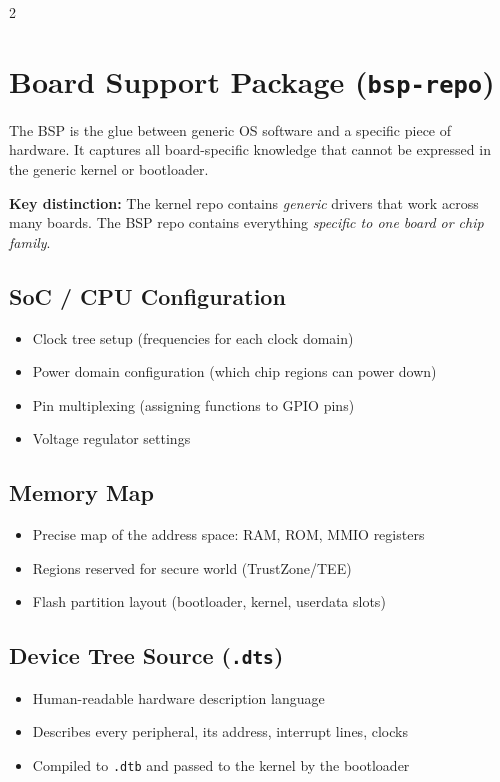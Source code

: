 2\documentclass[11pt,a4paper]{article}
\begin{document}
\section{Board Support Package (\texttt{bsp-repo})}

The BSP is the glue between generic OS software and a specific piece of hardware. It captures all board-specific knowledge that cannot be expressed in the generic kernel or bootloader.

\begin{infobox}
\textbf{Key distinction:} The kernel repo contains \textit{generic} drivers that work across many boards. The BSP repo contains everything \textit{specific to one board or chip family}.
\end{infobox}

\subsection{SoC / CPU Configuration}
\begin{itemize}[noitemsep]
  \item Clock tree setup (frequencies for each clock domain)
  \item Power domain configuration (which chip regions can power down)
  \item Pin multiplexing (assigning functions to GPIO pins)
  \item Voltage regulator settings
\end{itemize}

\subsection{Memory Map}
\begin{itemize}[noitemsep]
  \item Precise map of the address space: RAM, ROM, MMIO registers
  \item Regions reserved for secure world (TrustZone/TEE)
  \item Flash partition layout (bootloader, kernel, userdata slots)
\end{itemize}

\subsection{Device Tree Source (\texttt{.dts})}
\begin{itemize}[noitemsep]
  \item Human-readable hardware description language
  \item Describes every peripheral, its address, interrupt lines, clocks
  \item Compiled to \texttt{.dtb} and passed to the kernel by the bootloader
\end{itemize}
\end{document}
